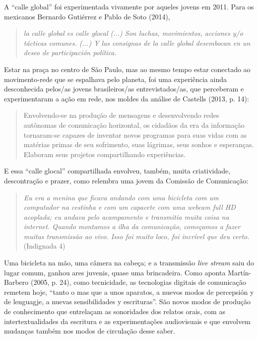 A ``calle global'' foi experimentada vivamente por aqueles jovens em
2011. Para os mexicanos Bernardo Gutiérrez e Pablo de Soto (2014),

\begin{quote}
\emph{la calle global es calle glocal (...) Son luchas, movimientos,
acciones y/o tácticas comunes. (...) Y las consignas de la calle global
desembocan en un deseo de participación política. }
\end{quote}

Estar na praça no centro de São Paulo, mas ao mesmo tempo estar
conectado ao movimento-rede que se espalhava pelo planeta, foi uma
experiência ainda desconhecida pelos/as jovens brasileiros/as
entrevistados/as, que perceberam e experimentaram a ação em rede, nos
moldes da análise de Castells (2013, p. 14):

\begin{quote}
Envolvendo-se na produção de mensagens e desenvolvendo redes autônomas
de comunicação horizontal, os cidadãos da era da informação tornaram-se
capazes de inventar novos programas para suas vidas com as matérias
primas de seu sofrimento, suas lágrimas, seus sonhos e esperanças.
Elaboram seus projetos compartilhando experiências.
\end{quote}

E essa ``calle glocal'' compartilhada envolveu, também, muita
criatividade, descontração e prazer, como relembra uma jovem da Comissão
de Comunicação:

\begin{quote}
\emph{Eu era a menina que ficava andando com uma bicicleta com um
computador na cestinha e com um capacete com uma webcam full HD
acoplada; eu andava pelo acampamento e transmitia muita coisa na
internet. Quando montamos a ilha da comunicação, começamos a fazer
muitas transmissão ao vivo. Isso foi muito loco, foi incrível que deu
certo.} (Indignada 4)
\end{quote}

Uma bicicleta na mão, uma câmera na cabeça; e a transmissão \emph{live
stream} saiu do lugar comum, ganhou ares juvenis, quase uma brincadeira.
Como aponta Martín-Barbero (2005, p. 24), como tecnicidade, as
tecnologias digitais de comunicação remetem hoje, ``tanto o mas que a
unos aparatos, a nuevos modos de percepsión y de lenguagje, a nuevas
sensibilidades y escrituras''. São novos modos de produção de
conhecimento que entrelaçam as sonoridades dos relatos orais, com as
intertextualidades da escritura e as experimentações audiovisuais e que
envolvem mudanças também nos modos de circulação desse saber.

